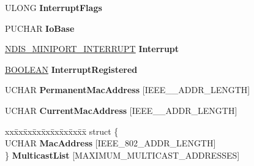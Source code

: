 \begin{DoxyCompactItemize}
\mbox{\label{struct___r_t_l___a_d_a_p_t_e_r_abce8dd83d455013ab3a52b1ea7bc3cec}} 
U\+L\+O\+NG {\bfseries Interrupt\+Flags}
\item 
\mbox{\label{struct___r_t_l___a_d_a_p_t_e_r_ac28942599586e366ecaa125c461b2ca3}} 
P\+U\+C\+H\+AR {\bfseries Io\+Base}
\item 
\mbox{\label{struct___r_t_l___a_d_a_p_t_e_r_a2ab9432ac8618f09b1c6256716da5cd6}} 
\hyperlink{struct___n_d_i_s___m_i_n_i_p_o_r_t___i_n_t_e_r_r_u_p_t}{N\+D\+I\+S\+\_\+\+M\+I\+N\+I\+P\+O\+R\+T\+\_\+\+I\+N\+T\+E\+R\+R\+U\+PT} {\bfseries Interrupt}
\item 
\mbox{\label{struct___r_t_l___a_d_a_p_t_e_r_a4ad9bf4388ed731c78665ec34f49db1c}} 
\hyperlink{_processor_bind_8h_a112e3146cb38b6ee95e64d85842e380a}{B\+O\+O\+L\+E\+AN} {\bfseries Interrupt\+Registered}
\item 
\mbox{\label{struct___r_t_l___a_d_a_p_t_e_r_adfb80a779a8a4ab31a902140bef36ee4}} 
U\+C\+H\+AR {\bfseries Permanent\+Mac\+Address} \mbox{[}I\+E\+E\+E\+\_\+\_\+\+A\+D\+D\+R\+\_\+\+L\+E\+N\+G\+TH\mbox{]}
\item 
\mbox{\label{struct___r_t_l___a_d_a_p_t_e_r_a4bbc0709a52276c7dd8fcc198345c519}} 
U\+C\+H\+AR {\bfseries Current\+Mac\+Address} \mbox{[}I\+E\+E\+E\+\_\+\_\+\+A\+D\+D\+R\+\_\+\+L\+E\+N\+G\+TH\mbox{]}
\item 
\mbox{\label{struct___r_t_l___a_d_a_p_t_e_r_a9e492a58d174575123c09c0232d27357}} 
\begin{tabbing}
xx\=xx\=xx\=xx\=xx\=xx\=xx\=xx\=xx\=\kill
struct \{\\
\>UCHAR {\bfseries MacAddress} \mbox{[}IEEE\_802\_ADDR\_LENGTH\mbox{]}\\
\} {\bfseries MulticastList} \mbox{[}MAXIMUM\_MULTICAST\_ADDRESSES\mbox{]}\\


\end{tabbing}
\end{DoxyCompactItemize}

